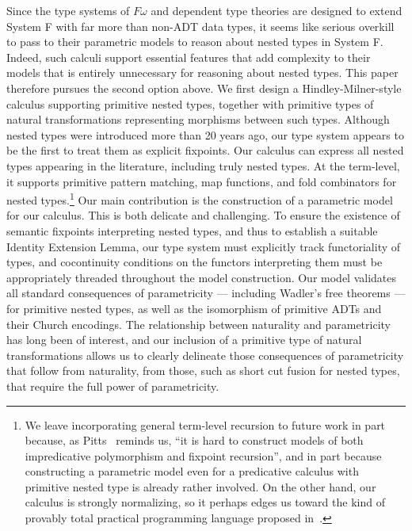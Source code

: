 \documentclass[runningheads]{llncs}
\begin{document}
Since the type systems of $F\omega$ and dependent type theories are
designed to extend System F with far more than non-ADT data types, it
seems like serious overkill to pass to their parametric models to
reason about nested types in System F. Indeed, such calculi support
essential features that add complexity to their models that is
entirely unnecessary for reasoning about nested types. This paper
therefore pursues the second option above.  We first design a
Hindley-Milner-style calculus supporting primitive nested types,
together with primitive types of natural transformations representing
morphisms between such types.  Although nested types were introduced
more than 20 years ago, our type system appears to be the first to
treat them as explicit fixpoints. Our calculus can express all nested
types appearing in the literature, including truly nested types.  At
the term-level, it supports primitive pattern matching, map functions,
and fold combinators for nested types.\footnote{We leave
  incorporating general term-level recursion to future work in part
  because, as Pitts~\cite{pit00} reminds us, ``it is hard to construct
  models of both impredicative polymorphism and fixpoint recursion'',
  and in part because constructing a parametric model even for a
  predicative calculus with primitive nested type is already rather
  involved.
  On the other hand, our calculus is strongly normalizing, so it
  perhaps edges us toward the kind of provably total practical
  programming language proposed in~\cite{wad89}.}  Our main
contribution is the construction of a parametric model for our
calculus. This is both delicate and challenging. To ensure the
existence of semantic fixpoints interpreting nested types, and thus to
establish a suitable Identity Extension Lemma, our type system must
explicitly track functoriality of types, and cocontinuity conditions
on the functors interpreting them must be appropriately threaded
throughout the model construction. Our model validates all standard
consequences of parametricity --- including Wadler's free theorems ---
for primitive nested types, as well as the isomorphism of primitive
ADTs and their Church encodings. The relationship between naturality
and parametricity has long been of interest, and our inclusion of a
primitive type of natural transformations allows us to clearly
delineate those consequences of parametricity
that follow from naturality,
from those, such as short cut fusion for nested types, that
require the full power of parametricity.
\end{document}
